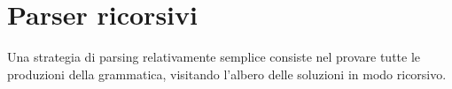 \section{Parser ricorsivi}\label{sec:parser-ricorsivi}



Una strategia di parsing relativamente semplice consiste nel provare tutte le
produzioni della grammatica, visitando l'albero delle soluzioni in modo ricorsivo.

